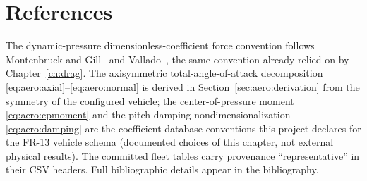 \section{References}
\label{sec:aero:references}

The dynamic-pressure dimensionless-coefficient force convention follows
Montenbruck and Gill~\cite[Sect.~3.5]{montenbruck2000} and
Vallado~\cite[Sect.~8.6.2]{vallado2013}, the same convention already
relied on by Chapter~\ref{ch:drag}. The axisymmetric total-angle-of-attack
decomposition \eqref{eq:aero:axial}--\eqref{eq:aero:normal} is derived in
Section~\ref{sec:aero:derivation} from the symmetry of the configured
vehicle; the center-of-pressure moment \eqref{eq:aero:cpmoment} and the
pitch-damping nondimensionalization \eqref{eq:aero:damping} are the
coefficient-database conventions this project declares for the FR-13
vehicle schema (documented choices of this chapter, not external physical
results). The committed fleet tables carry provenance
``representative'' in their CSV headers. Full bibliographic details
appear in the bibliography.
